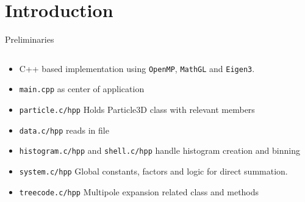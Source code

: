 \section{Introduction} %

\begin{frame}{Preliminaries}
	\begin{columns}[T] %
		\begin{column}{0.5\textwidth} %
			\begin{itemize}
				\item C++ based implementation using \texttt{OpenMP}, \texttt{MathGL} and \texttt{Eigen3}.
				\item \texttt{main.cpp} as center of application
				\item \texttt{particle.c/hpp} Holds Particle3D class with relevant members
				\item \texttt{data.c/hpp} reads in file
				\item \texttt{histogram.c/hpp} and \texttt{shell.c/hpp} handle histogram creation and binning
				\item \texttt{system.c/hpp} Global constants, factors and logic for direct
				      summation.
				\item \texttt{treecode.c/hpp} Multipole expansion related class and methods
			\end{itemize}
		\end{column}


\end{columns}
\end{frame}
